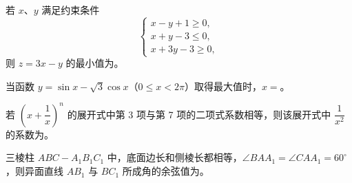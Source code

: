 \begin{question}
若 $x\text{、}y$ 满足约束条件
\nopagebreak[4]
\[
\begin{cases}
x-y+1\geqslant0,\\
x+y-3\leqslant0,\\
x+3y-3\geqslant0,
\end{cases}
\]
则 $z=3x-y$ 的最小值为\gkblank{}。

\end{question}
\begin{question}
当函数 $y=\sin x-\sqrt3\cos x$（$0\leqslant x<2\pi$）取得最大值时，$x=$\gkblank{}。

\end{question}
\begin{question}
若 $\left(x+\dfrac1x\right)^n$ 的展开式中第 3 项与第 7 项的二项式系数相等，则该展开式中 $\dfrac1{x^2}$ 的系数为\gkblank{}。

\end{question}
\begin{question}
三棱柱 $ABC-A_1B_1C_1$ 中，底面边长和侧棱长都相等，$\angle BAA_1=\angle CAA_1=60^\circ$，则异面直线 $AB_1$ 与 $BC_1$ 所成角的余弦值为\gkblank{}。

\end{question}

